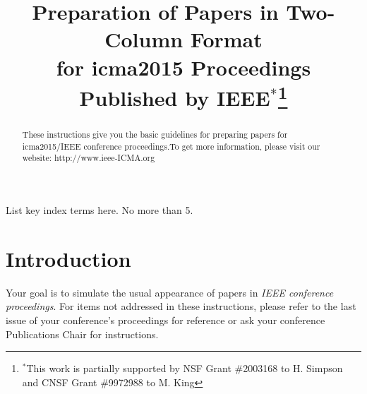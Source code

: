 \documentclass[conference,letterpaper]{IEEEtran}
\begin{document}
\title{\huge Preparation of Papers in Two-Column Format\\
for icma2015 Proceedings Published by IEEE$^{*}$\footnoterule\thanks{$^{*}$This work is partially
supported by NSF Grant \#2003168 to H. Simpson and CNSF Grant \#9972988 to M. King}}

\author{
%
\and
{}
}%

\maketitle
\begin{abstract}
These instructions give you the basic guidelines for preparing
papers for icma2015/IEEE conference proceedings.To get more information,
please visit our website: http://www.ieee-ICMA.org
\\
\end{abstract}

\begin{keywords}
List key index terms here. No more than 5.
\end{keywords}

\section{Introduction}
Your goal is to simulate the usual appearance of papers in \textit{IEEE
conference proceedings}. For items not addressed in these
instructions, please refer to the last issue of your conference's
proceedings for reference or ask your conference Publications
Chair for instructions.

\end{document}
